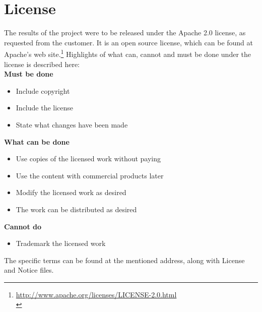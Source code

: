 \section{License}
\label{ref:apacheLicense}
The results of the project were to be released under the Apache 2.0 license, as requested from the customer. It is an open source license, which can be found  at Apache's web site.\footnote{\url{http://www.apache.org/licenses/LICENSE-2.0.html}\\}
Highlights of what can, cannot and must be done under the license is described here:\\
\textbf{Must be done}
\begin{itemize}
\item Include copyright
\item Include the license
\item State what changes have been made
\end{itemize}
\textbf{What can be done}
\begin{itemize}
\item Use copies of the licensed work without paying
\item Use the content with commercial products later
\item Modify the licensed work as desired
\item The work can be distributed as desired
\end{itemize}
\textbf{Cannot do}
\begin{itemize}
\item Trademark the licensed work
\end{itemize}
The specific terms can be found at the mentioned address, along with License and Notice files.

